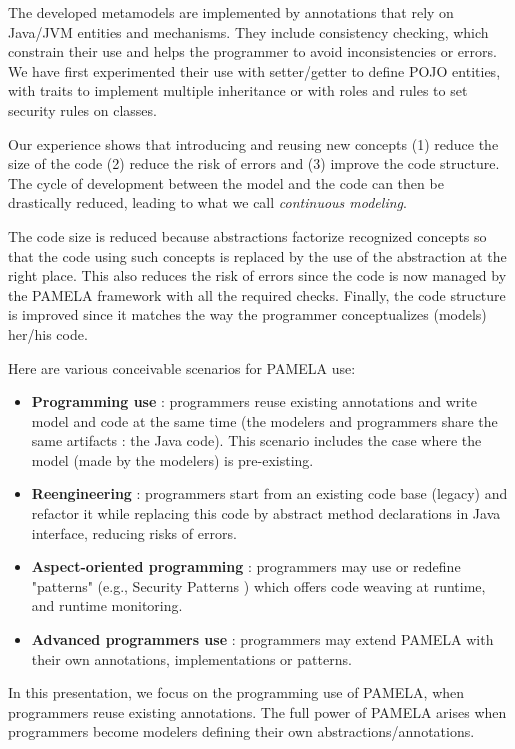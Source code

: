 
The developed metamodels are implemented by annotations that rely on Java/JVM entities and mechanisms. They include consistency checking, which constrain their use and helps the programmer to avoid inconsistencies or errors. We have first experimented their use with setter/getter to define POJO entities, with traits to implement multiple inheritance or with roles and rules to set security rules on classes.

Our experience shows that introducing and reusing new concepts (1) reduce the size of the code (2) reduce the risk of errors and (3) improve the code structure. The cycle of development between the model and the code can then be drastically reduced, leading to what we call \emph{continuous modeling}.

The code size is reduced because abstractions factorize recognized concepts so that the code using such concepts is replaced by the use of the abstraction at the right place. This also reduces the risk of errors since the code is now managed by the PAMELA framework with all the required checks. Finally, the code structure is improved since it matches the way the programmer conceptualizes (models) her/his code.

Here are various conceivable scenarios for PAMELA use:
\begin{itemize}
    \vspace{-0.2cm}\item \textbf{Programming use} : programmers reuse existing annotations and write model and code at the same time (the modelers and programmers share the same artifacts : the Java code). This scenario includes the case where the model (made by the modelers) is pre-existing.
    \vspace{-0.2cm}\item \textbf{Reengineering} : programmers start from an existing code base (legacy) and refactor it while replacing this code by abstract method declarations in Java interface, reducing risks of errors.
    \vspace{-0.2cm}\item \textbf{Aspect-oriented programming} : programmers may use or redefine "patterns" (e.g., Security Patterns \cite{silva20}) which offers code weaving at runtime, and runtime monitoring.
    \vspace{-0.2cm}\item \textbf{Advanced programmers use} : programmers may extend PAMELA with their own annotations, implementations or patterns.
\end{itemize}

In this presentation, we focus on the programming use of PAMELA, when programmers reuse existing annotations. The full power of PAMELA arises when programmers become modelers defining their own abstractions/annotations.

